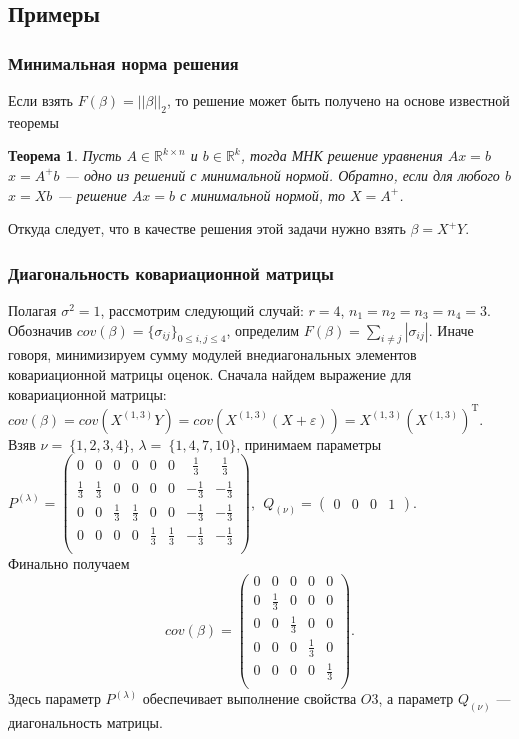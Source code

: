 \documentclass{spisok-article}
\newtheorem{mytheor}{Теорема}
\theoremstyle{definition}
\begin{document}
\subsection{Примеры}
\subsubsection{Минимальная норма решения}
Если взять $F(\beta) = ||\beta||_2$, то решение может быть получено на основе известной теоремы
\begin{mytheor} \cite{penrose2}
Пусть  $A \in \mathbb{R}^{k \times n}$ и $b \in \mathbb{R}^k$, тогда МНК решение уравнения $Ax=b$ $x=A^+b$ --- одно из решений с минимальной нормой. Обратно, если для любого $b$ $x=Xb$ --- решение $Ax=b$ с минимальной нормой, то $X=A^+$.
\end{mytheor}Откуда следует, что в качестве решения этой задачи нужно взять $\beta=X^+Y$.
\subsubsection{Диагональность ковариационной матрицы}
Полагая $\sigma^2 = 1$, рассмотрим следующий случай: $r = 4$, $n_1 =  n_2 = n_3 =  n_4 = 3$. Обозначив $cov(\beta) = \{\sigma_{ij}\}_{0 \leq i, j\leq 4}$, определим $F(\beta) = \sum_{i \neq j}{|\sigma_{ij}|}$. Иначе говоря, минимизируем сумму модулей внедиагональных элементов ковариационной матрицы оценок. Сначала найдем выражение для ковариационной матрицы: $cov(\beta) = cov(X^{(1,3)}Y) = cov\left(X^{(1,3)}(X + \varepsilon)\right) = X^{(1,3)}\left(X^{(1,3)}\right)^\mathrm{T}$.  
Взяв $\nu =~ \{1,2,3,4\}$, $\lambda =~ \{1, 4, 7, 10\}$, принимаем параметры\\ 
$P^{(\lambda)} = 
\begin{pmatrix}
0 & 0 & 0 & 0 & 0 & 0 & \ \ \frac{1}{3} & \ \ \frac{1}{3} \\
\frac{1}{3} & \frac{1}{3} & 0 & 0 & 0 & 0 & -\frac{1}{3} & -\frac{1}{3} \\
0 & 0 & \frac{1}{3} & \frac{1}{3} & 0 & 0 & -\frac{1}{3} & -\frac{1}{3} \\
0 & 0 & 0 & 0 & \frac{1}{3} & \frac{1}{3} & -\frac{1}{3} & -\frac{1}{3} \\
\end{pmatrix}, 
\ \ Q_{(\nu)} = \begin{pmatrix}
0 & 0 & 0 & 1
\end{pmatrix}.
$\\
Финально получаем \[
cov(\beta) = \begin{pmatrix}
0 & 0 & 0 & 0 & 0 \\
0 & \frac{1}{3} & 0 & 0 & 0 \\
0 & 0 & \frac{1}{3} & 0 & 0 \\
0 & 0 & 0 & \frac{1}{3} & 0 \\
0 & 0 & 0 & 0 & \frac{1}{3} \\
\end{pmatrix}.
\]
Здесь параметр $P^{(\lambda)}$ обеспечивает выполнение свойства $O3$, а параметр $Q_{(\nu)}$ --- диагональность матрицы. 
\end{document}
